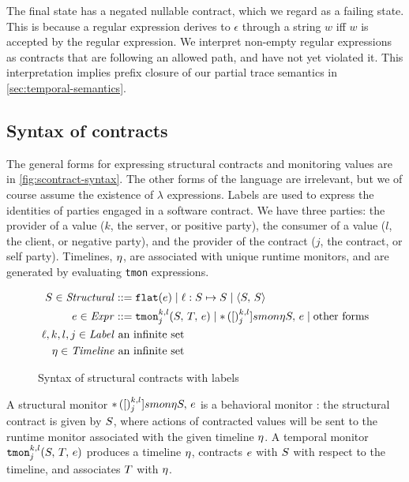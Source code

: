 The final state has a negated nullable contract, which we regard as a failing state.
%
This is because a regular expression derives to $\epsilon$ through a string $w$ iff $w$ is accepted by the regular expression.
%
We interpret non-empty regular expressions as contracts that are following an allowed path, and have not yet violated it.
%
This interpretation implies prefix closure of our partial trace semantics in \autoref{sec:temporal-semantics}.

\subsection{Syntax of contracts}

The general forms for expressing structural contracts and monitoring values are in \autoref{fig:scontract-syntax}.
%
The other forms of the language are irrelevant, but we of course assume the existence of $\lambda$ expressions.
%
Labels are used to express the identities of parties engaged in a software contract.
%
We have three parties: the provider of a value ($k$, the server, or positive party), the consumer of a value ($l$, the client, or negative party), and the provider of the contract ($j$, the contract, or self party).
%
Timelines, $\eta$, are associated with unique runtime monitors, and are generated by evaluating {\tt tmon} expressions.

\begin{figure}
  \begin{align*}
    S \in \mathit{Structural} &::= {\tt flat}(e) \mid \ell : S \mapsto S \mid \langle S,\, S\rangle
\\
    e \in \mathit{Expr} &::= {\tt tmon}{^{k,l}_{j}}({S,\,T,\,e})
                    \mid {\tt *}{\,}({[})^{k,l}_{j}]{smon}{\eta}{S,\, e}
                    \mid \text{other forms}
\\
\ell,k,l,j \in \mathit{Label}&\text{ an infinite set} \\
\eta \in \mathit{Timeline} &\text{ an infinite set}
  \end{align*}
  \caption{Syntax of structural contracts with labels}
  \label{fig:scontract-syntax}
\end{figure}

A structural monitor ${\tt *}{\,}({[})^{k,l}_{j}]{smon}{\eta}{S,\, e}$ is a behavioral monitor \citep{ianjohnson:dthf:complete}: the structural contract is given by $S$, where actions of contracted values will be sent to the runtime monitor associated with the given timeline $\eta$.
%
A temporal monitor ${\tt tmon}{^{k,l}_{j}}({S,\,T,\,e})$ produces a timeline $\eta$, contracts $e$ with $S$ with respect to the timeline, and associates $T$ with $\eta$.

